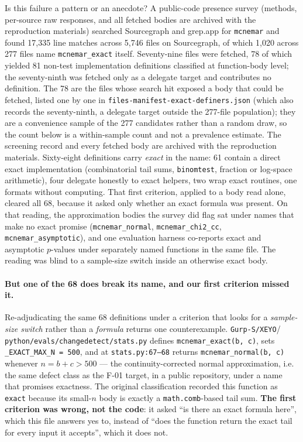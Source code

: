 \documentclass[10pt]{article}
\newcommand{\code}[1]{\texttt{#1}}
\begin{document}
Is this failure a pattern or an anecdote? A public-code presence survey
(methods, per-source raw responses, and all fetched bodies are archived
with the reproduction materials) searched Sourcegraph and grep.app for
\code{mcnemar} and found 17{,}335 line matches across 5{,}746 files on
Sourcegraph, of which 1{,}020 across 277 files name
\code{mcnemar\_exact} itself. Seventy-nine files were fetched, 78 of which
yielded 81 non-test implementation definitions classified at function-body
level; the seventy-ninth was fetched only as a delegate target and contributes
no definition. The 78 are the files whose search hit exposed a body that could
be fetched, listed one by one in
\code{files-manifest-exact-definers.json} (which also records the seventy-ninth,
a delegate target outside the 277-file population); they are a convenience
sample of the 277 candidates rather than a random draw, so the count below is a
within-sample count and not a prevalence estimate. The screening record and
every fetched body are archived with the reproduction
materials. Sixty-eight definitions carry \emph{exact} in the name: 61 contain
a direct exact implementation (combinatorial tail sums,
\code{binomtest}, fraction or log-space arithmetic), four delegate
honestly to exact helpers, two wrap exact routines, one formats without
computing. That first criterion, applied to a body read alone, cleared all
68, because it asked only whether an exact formula was present. On that
reading, the approximation bodies the survey did flag sat under names that
make no exact promise (\code{mcnemar\_normal}, \code{mcnemar\_chi2\_cc},
\code{mcnemar\_asymptotic}), and one evaluation harness co-reports exact and
asymptotic $p$-values under separately named functions in the same file. The
reading was blind to a sample-size switch inside an otherwise exact body.

\paragraph{But one of the 68 does break its name, and our first criterion
missed it.} Re-adjudicating the same 68 definitions under a criterion that
looks for a \emph{sample-size switch} rather than a \emph{formula} returns
one counterexample. \code{Gurp-S/XEYO}\allowbreak/\allowbreak
\code{python/evals/changedetect/stats.py} defines
\code{mcnemar\_exact(b, c)}, sets \code{\_EXACT\_MAX\_N = 500}, and at
\code{stats.py:67--68} returns \code{mcnemar\_normal(b, c)} whenever
$n = b+c > 500$ --- the continuity-corrected normal approximation, i.e. the
same defect class as the F-01 target, in a public repository, under a name
that promises exactness. The original classification recorded this function
as \code{exact} because its small-$n$ body is exactly a
\code{math.comb}-based tail sum. \textbf{The first criterion was wrong, not
the code}: it asked ``is there an exact formula here'', which this file
answers yes to, instead of ``does the function return the exact tail for
every input it accepts'', which it does not.
\end{document}
